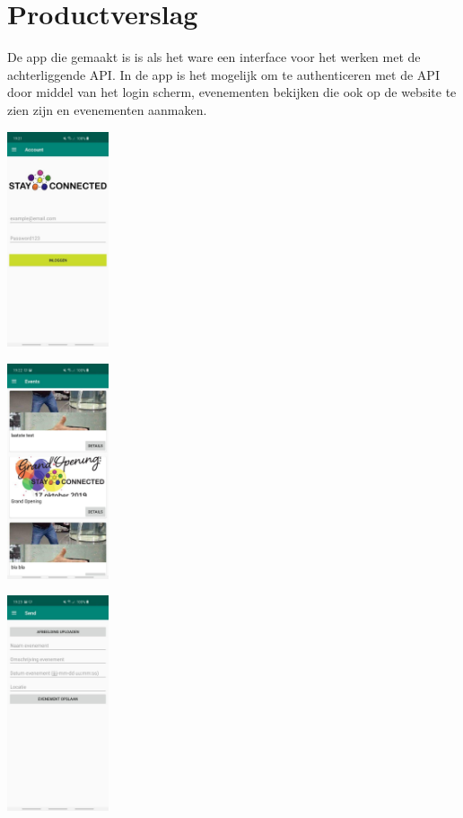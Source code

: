 \documentclass[dutch]{report}
\begin{document}
	\newpage
	
	\section{Productverslag}
	De app die gemaakt is is als het ware een interface voor het werken met de achterliggende API.
	In de app is het mogelijk om te authenticeren met de API door middel van het login scherm, evenementen bekijken die ook op de website te zien zijn en evenementen aanmaken.
		
	\begin{minipage}{0.33\textwidth}
		\begin{center}
			\includegraphics[width=3cm]{images/FOTOLOGINSCHERM.jpg}		
		\end{center}
	\end{minipage}
	\begin{minipage}{0.34\textwidth}
		\begin{center}
			\includegraphics[width=3cm]{images/FOTOEVENTLIJST.jpg}
		\end{center}
	\end{minipage}
	\begin{minipage}{0.33\textwidth}
		\begin{center}
			\includegraphics[width=3cm]{images/FOTOEVENTCREATE.jpg}
		\end{center}
	\end{minipage}
	
\end{document}
